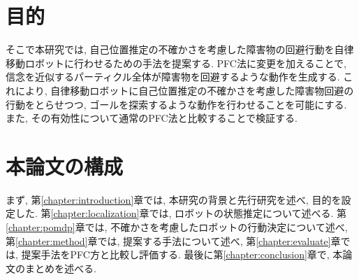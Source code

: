 \section{目的}
そこで本研究では, 自己位置推定の不確かさを考慮した障害物の回避行動を自律移動ロボットに行わせるための手法を提案する. 
PFC法に変更を加えることで, 信念を近似するパーティクル全体が障害物を回避するような動作を生成する. 
これにより, 自律移動ロボットに自己位置推定の不確かさを考慮した障害物回避の行動をとらせつつ, ゴールを探索するような動作を行わせることを可能にする. 
また, その有効性について通常のPFC法と比較することで検証する. 


\section{本論文の構成}
まず, 第\ref{chapter:introduction}章では, 本研究の背景と先行研究を述べ, 目的を設定した. 
第\ref{chapter:localization}章では, ロボットの状態推定について述べる. 
第\ref{chapter:pomdp}章では, 不確かさを考慮したロボットの行動決定について述べ, 
第\ref{chapter:method}章では, 提案する手法について述べ, 
第\ref{chapter:evaluate}章では, 提案手法をPFC方と比較し評価する. 
最後に第\ref{chapter:conclusion}章で, 本論文のまとめを述べる. 


